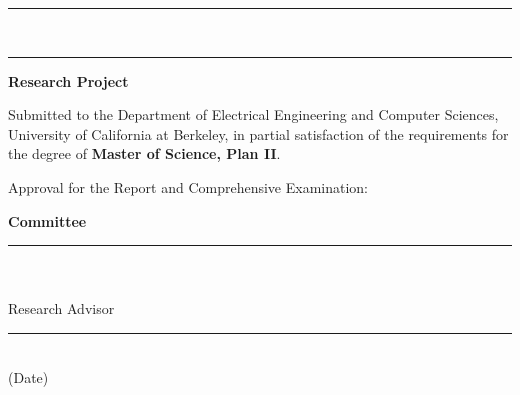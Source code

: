 \setlength{\rulewidth}{2.5in}
\setlength{\ruleheight}{0.5pt}

\begin{titlepage}
\begin{addmargin}{0.45in}

    \begin{center}
        \rule{\linewidth}{}
        \vspace*{2ex}

        \makeatletter
        \begin{LARGE}
            \textsf{\textbf{\@title}}
        \end{LARGE}
        \\ [3ex]
        \begin{large}
            \@author
        \end{large}
        \makeatother

        \vspace*{2ex}
        \rule{\linewidth}{}
    \end{center}

    \vspace*{2ex}
    \begin{center}
        \begin{large}
            \textsf{\textbf{Research Project}}
        \end{large}
    \end{center}

    \noindent
    Submitted to the Department of Electrical Engineering and Computer Sciences, University of California at Berkeley, in partial satisfaction of the requirements for the degree of \textsf{\textbf{Master of Science, Plan II}}.

    \vspace*{5ex}
    \noindent
    Approval for the Report and Comprehensive Examination:

    \vspace*{2ex}
    \begin{center}
        \textsf{\textbf{Committee}}

        \begin{small}
            \vspace*{8ex}
            \rule{}{} \\
            \researchadvisor \\
            Research Advisor
    
            \vspace*{5ex}
            \rule{}{} \\
            (Date)
    

\end{small}
\end{center}
\end{addmargin}
\end{titlepage}
